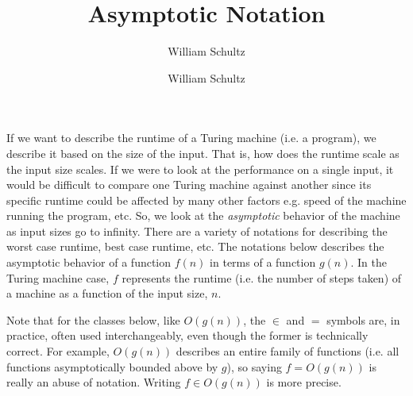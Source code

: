 \documentclass[10pt,a4paper]{article}
\author{William Schultz}
\begin{document}
\title{Asymptotic Notation}
\author{William Schultz}
\maketitle
 
If we want to describe the runtime of a Turing machine (i.e. a program), we describe it based on the size of the input. That is, how does the runtime scale as the input size scales. If we were to look at the performance on a single input, it would be difficult to compare one Turing machine against another since its specific runtime could be affected by many other factors e.g. speed of the machine running the program, etc. So, we look at the \textit{asymptotic} behavior of the machine as input sizes go to infinity. There are a variety of notations for describing the worst case runtime, best case runtime, etc. The notations below describes the asymptotic behavior of a function $f(n)$ in terms of a function $g(n)$. In the Turing machine case, $f$ represents the runtime (i.e. the number of steps taken) of a machine as a function of the input size, $n$.

Note that for the classes below, like $O(g(n))$, the $\in$ and $=$ symbols are, in practice, often used interchangeably, even though the former is technically correct. For example, $O(g(n))$ describes an entire family of functions (i.e. all functions asymptotically bounded above by $g$), so saying $f = O(g(n))$ is really an abuse of notation. Writing $f \in O(g(n))$ is more precise.
\end{document}
